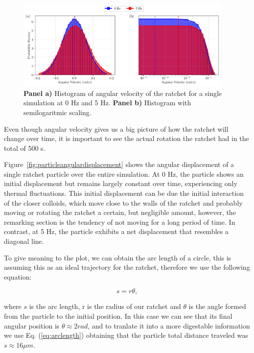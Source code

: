 \begin{figure}[h!]
  \begin{center}
    \includegraphics[width=0.95\textwidth]{figures/histogram_comparison.pdf}
  \end{center}
  \caption[Histogram of angular velocity.]{\textbf{Panel a)} Histogram of angular velocity of the ratchet for a single simulation at 0 Hz and 5 Hz. \textbf{Panel b)} Histogram with semilogaritmic scaling.}\label{fig:histogram}
\end{figure}

Even though angular velocity gives us a big picture of how the ratchet will change over time, it is important to see the actual rotation the ratchet had in the total of 500 s.

Figure~\ref{fig:particleangulardisplacement} shows the angular displacement of a single ratchet particle over the entire simulation. At 0 Hz, the particle shows an initial displacement but remains largely constant over time, experiencing only thermal fluctuations. This initial displacement can be due the initial interaction of the closer colloids, which move close to the walls of the ratchet and probably moving or rotating the ratchet a certain, but negligible amount, however, the remarking section is the tendency of not moving for a long period of time. In contrast, at 5 Hz, the particle exhibits a net displacement that resembles a diagonal line. 

To give meaning to the plot, we can obtain the arc length of a circle, this is assuming this as an ideal trajectory for the ratchet, therefore we use the following equation:

\begin{equation}
  s = r\theta,
  \label{eq:arclength}
\end{equation}

where $s$ is the arc length, r is the radius of our ratchet and $\theta$ is the angle formed from the particle to the initial position.
In this case we can see that its final angular position is $\theta \approx 2 rad$, and to tranlate it into a more digestable information we use Eq. (\ref{eq:arclength}) obtaining that the particle total distance traveled was $s \approx 16 \mu m$.

